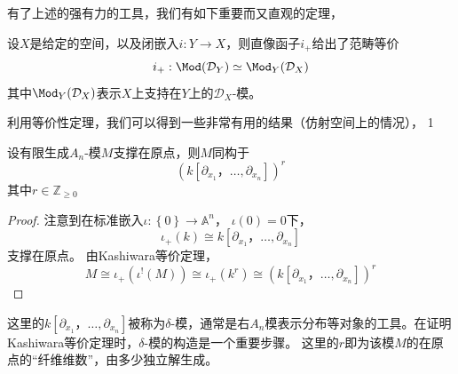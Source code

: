 有了上述的强有力的工具，我们有如下重要而又直观的定理，
\begin{theorem}
    \label{thm:Kashiwara等价定理}
    设$X$是给定的空间，以及闭嵌入$i:Y\rightarrow X$，则直像函子$i_+$给出了范畴等价
    \begin{equation*}
        i_+:\Mod (\mathcal{D}_Y)\simeq \Mod_Y(\mathcal{D}_X)
    \end{equation*}
    其中$\Mod_Y(\mathcal{D}_X)$表示$X$上支持在$Y$上的$\mathcal{D}_X$-模。
\end{theorem}
利用等价性定理，我们可以得到一些非常有用的结果（仿射空间上的情况），
1
\begin{corollary}
    设有限生成$A_n$-模$M$支撑在原点，则$M$同构于
    \begin{equation*}
        ( k[\partial_{x_1}，\ldots,\partial_{x_n}])^r
    \end{equation*}
    其中$r\in \mathbb{Z}_{\geq 0}$
    \begin{proof}
        注意到在标准嵌入$\iota :\left\{0\right\}\rightarrow \mathbb{A}^n$， $\iota(0)=0$下，
        \begin{equation*}
            \iota_+(k) \cong k[\partial_{x_1}，\ldots,\partial_{x_n}]
        \end{equation*}
        支撑在原点。
        由Kashiwara等价定理，
        \begin{equation*}
            M\cong \iota_+(\iota^!(M))\cong \iota_+(k^r)\cong ( k[\partial_{x_1}，\ldots,\partial_{x_n}])^r
        \end{equation*}
    \end{proof}
\end{corollary}

\begin{remark}
    这里的$k[\partial_{x_1}，\ldots,\partial_{x_n}]$被称为$\delta$-模，通常是右$A_n$模表示分布等对象的工具。在证明Kashiwara等价定理时，$\delta$-模的构造是一个重要步骤。
    这里的$r$即为该模$M$的在原点的“纤维维数”，由多少独立解生成。
\end{remark}



